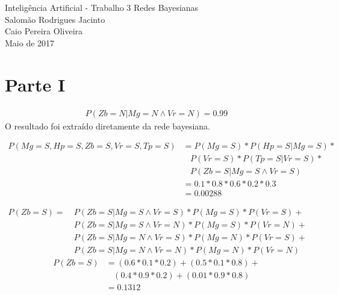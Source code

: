 \documentclass[answers]{exam}
\begin{document}
\begin{center}
Inteligência Artificial - Trabalho 3 Redes Bayesianas \\
Salomão Rodrigues Jacinto\\
Caio Pereira Oliveira\\
Maio de 2017
\end{center}

\unframedsolutions{}

\section{Parte I}
\begin{questions}

\question
\begin{solution}
\begin{align*}
\nonumber
P(Zb=N|Mg=N \land Vr=N) = 0.99
\end{align*}
O resultado foi extraído diretamente da rede bayesiana.
\end{solution}

\question
\begin{solution}
\begin{align*}
    P(Mg=S, Hp=S, Zb=S, Vr=S, Tp=S) 
    &= P(Mg=S) * P(Hp=S|Mg=S) * \\
    &\ \ \ \ P(Vr=S) * P(Tp=S|Vr=S) * \\
    &\ \ \ \ P(Zb=S|Mg=S \land Vr=S)\\
    &= 0.1 * 0.8 * 0.6 * 0.2 * 0.3\\
    &=0.00288
\end{align*}
\end{solution}

\question
\begin{solution}
\begin{align*}
    P(Zb=S) = &\ P(Zb=S|Mg=S \land Vr=S) * P(Mg=S) * P(Vr=S) +\\
              &\ P(Zb=S|Mg=S \land Vr=N) * P(Mg=S) * P(Vr=N) +\\
              &\ P(Zb=S|Mg=N \land Vr=S) * P(Mg=N) * P(Vr=S) +\\
              &\ P(Zb=S|Mg=N \land Vr=N) * P(Mg=N) * P(Vr=N)
\end{align*}
\begin{align*}
    P(Zb=S) &= (0.6 * 0.1 * 0.2) + (0.5 * 0.1 * 0.8) + \\
            &\ \ \ \ (0.4 * 0.9 * 0.2) + (0.01 * 0.9 * 0.8)\\
            &= 0.1312
\end{align*}
\end{solution}


\end{questions}
\end{document}
